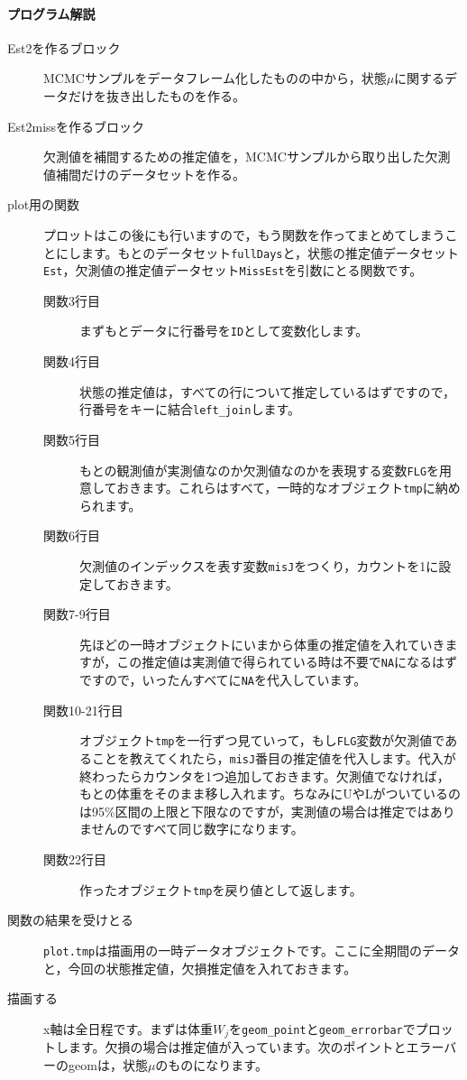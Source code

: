 \documentclass{ltjsbook}
\begin{document}
\paragraph{プログラム解説}
\begin{description}
	\item[Est2を作るブロック] MCMCサンプルをデータフレーム化したものの中から，状態$\mu$に関するデータだけを抜き出したものを作る。
	\item[Est2missを作るブロック] 欠測値を補間するための推定値を，MCMCサンプルから取り出した欠測値補間だけのデータセットを作る。
	\item[plot用の関数] プロットはこの後にも行いますので，もう関数を作ってまとめてしまうことにします。もとのデータセット\verb|fullDays|と，状態の推定値データセット\verb|Est|，欠測値の推定値データセット\verb|MissEst|を引数にとる関数です。
	      \begin{description}
		      \item[関数3行目] まずもとデータに行番号を\verb|ID|として変数化します。
		      \item[関数4行目] 状態の推定値は，すべての行について推定しているはずですので，行番号をキーに結合\verb|left_join|します。
		      \item[関数5行目] もとの観測値が実測値なのか欠測値なのかを表現する変数\verb|FLG|を用意しておきます。これらはすべて，一時的なオブジェクト\verb|tmp|に納められます。
		      \item[関数6行目] 欠測値のインデックスを表す変数\verb|misJ|をつくり，カウントを1に設定しておきます。
		      \item[関数7-9行目] 先ほどの一時オブジェクトにいまから体重の推定値を入れていきますが，この推定値は実測値で得られている時は不要で\verb|NA|になるはずですので，いったんすべてに\verb|NA|を代入しています。
		      \item[関数10-21行目] オブジェクト\verb|tmp|を一行ずつ見ていって，もし\verb|FLG|変数が欠測値であることを教えてくれたら，\verb|misJ|番目の推定値を代入します。代入が終わったらカウンタを1つ追加しておきます。欠測値でなければ，もとの体重をそのまま移し入れます。ちなみにUやLがついているのは95\%区間の上限と下限なのですが，実測値の場合は推定ではありませんのですべて同じ数字になります。
		      \item[関数22行目] 作ったオブジェクト\verb|tmp|を戻り値として返します。
	      \end{description}
	\item[関数の結果を受けとる] \verb|plot.tmp|は描画用の一時データオブジェクトです。ここに全期間のデータと，今回の状態推定値，欠損推定値を入れておきます。
	\item[描画する] x軸は全日程です。まずは体重$W_j$を\verb|geom_point|と\verb|geom_errorbar|でプロットします。欠損の場合は推定値が入っています。次のポイントとエラーバーのgeomは，状態$\mu$のものになります。
\end{description}
\end{document}
